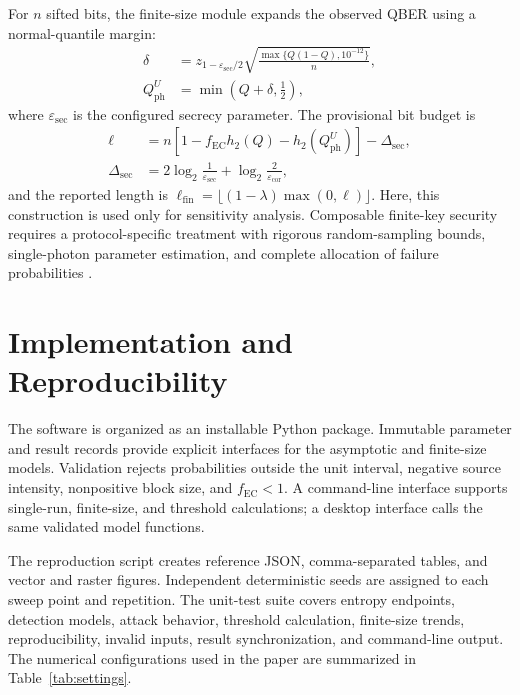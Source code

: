 \documentclass[conference]{IEEEtran}
\begin{document}
For \(n\) sifted bits, the finite-size module expands the observed QBER using a
normal-quantile margin:
\begin{align}
\delta &=
z_{1-\varepsilon_{\mathrm{sec}}/2}
\sqrt{\frac{\max\{Q(1-Q),10^{-12}\}}{n}},
\label{eq:margin}\\
Q_{\mathrm{ph}}^{U} &= \min\!\left(Q+\delta,\frac{1}{2}\right),
\label{eq:phase}
\end{align}
where \(\varepsilon_{\mathrm{sec}}\) is the configured secrecy parameter.
The provisional bit budget is
\begin{align}
\ell &=
n\!\left[1-f_{\mathrm{EC}}h_2(Q)
-h_2\!\left(Q_{\mathrm{ph}}^{U}\right)\right]-\Delta_{\mathrm{sec}},
\label{eq:finite}\\
\Delta_{\mathrm{sec}}
&=2\log_2\!\frac{1}{\varepsilon_{\mathrm{sec}}}
+\log_2\!\frac{2}{\varepsilon_{\mathrm{cor}}},
\label{eq:overhead}
\end{align}
and the reported length is
\(\ell_{\mathrm{fin}}=\lfloor(1-\lambda)\max(0,\ell)\rfloor\).
Here, this construction is used only for sensitivity analysis. Composable
finite-key security requires a protocol-specific treatment with rigorous
random-sampling bounds, single-photon parameter estimation, and complete
allocation of failure probabilities \cite{tomamichel2012}.

\section{Implementation and Reproducibility}

The software is organized as an installable Python package. Immutable parameter
and result records provide explicit interfaces for the asymptotic and
finite-size models. Validation rejects probabilities outside the unit interval,
negative source intensity, nonpositive block size, and
\(f_{\mathrm{EC}}<1\). A command-line interface supports single-run,
finite-size, and threshold calculations; a desktop interface calls the same
validated model functions.

The reproduction script creates reference JSON, comma-separated tables, and
vector and raster figures. Independent deterministic seeds are assigned to
each sweep point and repetition. The unit-test suite covers entropy endpoints,
detection models, attack behavior, threshold calculation, finite-size trends,
reproducibility, invalid inputs, result synchronization, and command-line
output. The numerical
configurations used in the paper are summarized in Table~\ref{tab:settings}.
\end{document}

